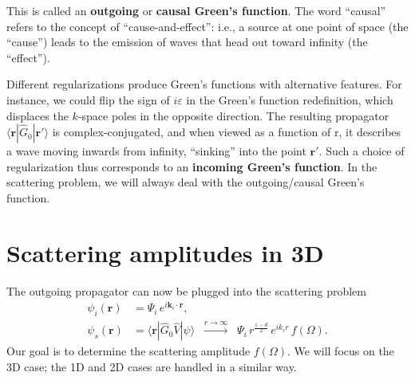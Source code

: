\documentclass[pra,12pt]{revtex4}
\begin{document}
This is called an \textbf{outgoing} or \textbf{causal Green's
  function}.  The word ``causal'' refers to the concept of
``cause-and-effect'': i.e., a source at one point of space (the
``cause'') leads to the emission of waves that head out toward
infinity (the ``effect'').

Different regularizations produce Green's functions with alternative
features.  For instance, we could flip the sign of $i\varepsilon$ in
the Green's function redefinition, which displaces the $k$-space poles
in the opposite direction.  The resulting propagator
$\langle\mathbf{r}|\hat{G}_0|\mathbf{r}'\rangle$ is
complex-conjugated, and when viewed as a function of $\mathrm{r}$, it
describes a wave moving inwards from infinity, ``sinking'' into the
point $\mathbf{r}'$.  Such a choice of regularization thus corresponds
to an \textbf{incoming Green's function}.  In the scattering problem,
we will always deal with the outgoing/causal Green's function.

\section{Scattering amplitudes in 3D}

The outgoing propagator can now be plugged into the scattering problem
$$\begin{aligned} \psi_i(\mathbf{r}) &= \Psi_i \, e^{i\mathbf{k}_i\cdot\mathbf{r}}, \\ \psi_s(\mathbf{r}) &= \langle\mathbf{r}| \hat{G}_0 \hat{V} |\psi\rangle \;\; \overset{r\rightarrow\infty}{\longrightarrow}\;\; \Psi_i \, r^{\frac{1-d}{2}} \, e^{ik_ir} \, f(\Omega).
\end{aligned}$$
Our goal is to determine the scattering amplitude $f(\Omega)$.  We
will focus on the 3D case; the 1D and 2D cases are handled in a
similar way.
\end{document}
